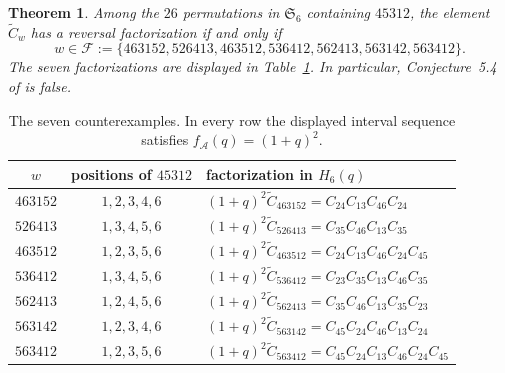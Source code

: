 \documentclass[11pt]{amsart}
\newtheorem{theorem}{Theorem}
\theoremstyle{remark}
\newcommand{\Ssix}{\mathfrak S_6}
\newcommand{\Ct}{\widetilde C}
\newcommand{\Cab}[2]{C_{#1#2}}
\begin{document}
\begin{theorem}\label{thm:main}
Among the $26$ permutations in $\Ssix$ containing $45312$, the element
$\Ct_w$ has a reversal factorization if and only if
\[
w\in\mathcal F:=
\{463152,526413,463512,536412,562413,563142,563412\}.
\]
The seven factorizations are displayed in
Table~\ref{tab:factorizations}. In particular, Conjecture~5.4 of
\cite{ParisiEtAl} is false.
\end{theorem}

\begin{table}[t]
\centering
\small
\caption{The seven counterexamples. In every row the displayed
interval sequence satisfies $f_{\mathcal A}(q)=(1+q)^2$.}
\label{tab:factorizations}
\begin{tabular}{@{}ccl@{}}
\toprule
$w$ & positions of $45312$ & factorization in $H_6(q)$ \\
\midrule
$463152$ & $1,2,3,4,6$ &
$(1+q)^2\Ct_{463152}=\Cab{2}{4}\Cab{1}{3}\Cab{4}{6}\Cab{2}{4}$ \\
$526413$ & $1,3,4,5,6$ &
$(1+q)^2\Ct_{526413}=\Cab{3}{5}\Cab{4}{6}\Cab{1}{3}\Cab{3}{5}$ \\
$463512$ & $1,2,3,5,6$ &
$(1+q)^2\Ct_{463512}=\Cab{2}{4}\Cab{1}{3}\Cab{4}{6}\Cab{2}{4}\Cab{4}{5}$ \\
$536412$ & $1,3,4,5,6$ &
$(1+q)^2\Ct_{536412}=\Cab{2}{3}\Cab{3}{5}\Cab{1}{3}\Cab{4}{6}\Cab{3}{5}$ \\
$562413$ & $1,2,4,5,6$ &
$(1+q)^2\Ct_{562413}=\Cab{3}{5}\Cab{4}{6}\Cab{1}{3}\Cab{3}{5}\Cab{2}{3}$ \\
$563142$ & $1,2,3,4,6$ &
$(1+q)^2\Ct_{563142}=\Cab{4}{5}\Cab{2}{4}\Cab{4}{6}\Cab{1}{3}\Cab{2}{4}$ \\
$563412$ & $1,2,3,5,6$ &
$(1+q)^2\Ct_{563412}=\Cab{4}{5}\Cab{2}{4}\Cab{1}{3}\Cab{4}{6}\Cab{2}{4}\Cab{4}{5}$ \\
\bottomrule
\end{tabular}
\end{table}
\end{document}
